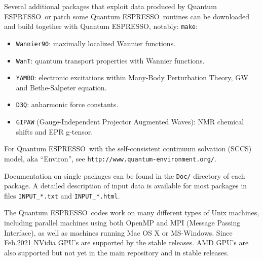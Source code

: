\documentclass[12pt,a4paper]{article}
\def\qe{{\sc Quantum ESPRESSO}}
\def\make{\texttt{make}}
\begin{document}
Several additional packages that exploit data produced by \qe\
or patch some \qe\ routines can be downloaded and build together with \qe,
notably:
\make:
\begin{itemize}
\item \texttt{Wannier90}:
      maximally localized Wannier functions.
\item \texttt{WanT}:
      quantum transport properties with Wannier functions.
\item \texttt{YAMBO}:
      electronic excitations within Many-Body Perturbation Theory,
      GW and Bethe-Salpeter equation.
\item \texttt{D3Q}:
      anharmonic force constants.
\item \texttt{GIPAW} (Gauge-Independent Projector Augmented Waves):
      NMR chemical shifts and EPR g-tensor.
\end{itemize}
For \qe\ with the self-consistent continuum solvation (SCCS) model,
aka ``Environ'', see \texttt{http://www.quantum-environment.org/}.

Documentation on single packages can be found in the \texttt{Doc/}
directory of each package. A detailed description of input
data is available for most packages in files \texttt{INPUT\_*.txt} and
\texttt{INPUT\_*.html}.

The \qe\ codes work on many different types of Unix machines,
including parallel machines using both OpenMP and MPI
(Message Passing Interface), as well as machines running
Mac OS X or MS-Windows.
Since Feb.2021 NVidia GPU's are supported by the stable releases.
AMD GPU's are also supported but not yet in the main repository
and in stable releases.
\end{document}
